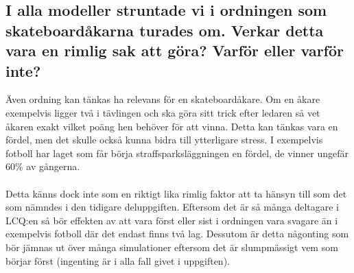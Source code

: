 \documentclass{article}
\begin{document}
\subsection{I alla modeller struntade vi i ordningen som skateboardåkarna turades om. Verkar detta vara en rimlig sak att göra? Varför eller varför inte?}
Även ordning kan tänkas ha relevans för en skateboardåkare. Om en åkare exempelvis ligger två i tävlingen och ska göra sitt trick efter ledaren så vet åkaren exakt vilket poäng hen behöver för att vinna.
Detta kan tänkas vara en fördel, men det skulle också kunna bidra till ytterligare stress. I exempelvis fotboll har laget som får börja straffsparksläggningen en fördel, de vinner ungefär 60\% av gångerna.
\\\\
Detta känns dock inte som en riktigt lika rimlig faktor att ta hänsyn till som det som nämndes i den tidigare deluppgiften.
Eftersom det är så många deltagare i LCQ:en så bör effekten av att vara först eller sist i ordningen vara svagare än i exempelvis fotboll där det endast finns två lag.
Dessutom är detta någonting som bör jämnas ut över många simulationer eftersom det är slumpmässigt vem som börjar först (ingenting är i alla fall givet i uppgiften).
\end{document}
